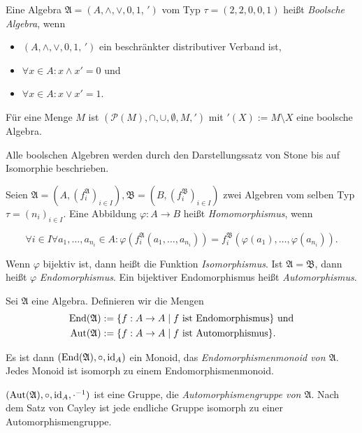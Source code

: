 \begin{definition}
    Eine Algebra $\mathfrak{A} = (A, \wedge, \vee, 0, 1, \,')$ vom Typ $\tau = (2,2,0,0,1)$ heißt \emph{Boolsche Algebra}, wenn
    \begin{itemize}[topsep=0pt, label={--}]
        \item $(A, \wedge, \vee, 0, 1, \,')$ ein beschränkter distributiver Verband ist,
        \item $\forall x \in A: x \wedge x' = 0$ und
        \item $\forall x \in A: x \vee x' = 1$.
    \end{itemize}
\end{definition}

\begin{example}
    Für eine Menge $M$ ist $(\mathcal{P}(M), \cap, \cup, \emptyset, M, ')$ mit $'(X) := M \setminus X$ eine boolsche Algebra.
\end{example}

\begin{remark}
    Alle boolschen Algebren werden durch den Darstellungssatz von Stone bis auf Isomorphie beschrieben.
\end{remark}

\begin{definition}
    Seien $\mathfrak{A} = (A, (f_i^\mathfrak{A})_{i \in I}), \mathfrak{B} = (B, (f_i^\mathfrak{B})_{i \in I})$ zwei Algebren vom selben Typ $\tau = (n_i)_{i \in I}$. Eine Abbildung $\varphi: A \to B$ heißt \emph{Homomorphismus}, wenn

    $$\forall i \in I \forall a_1, \ldots, a_{n_i} \in A: \varphi(f_i^\mathfrak{A}(a_1, \ldots, a_{n_i})) = f_i^\mathfrak{B}(\varphi(a_1), \ldots, \varphi(a_{n_i})). $$

    Wenn $\varphi$ bijektiv ist, dann heißt die Funktion \emph{Isomorphismus}.
    Ist $\mathfrak{A} = \mathfrak{B}$, dann heißt $\varphi$ \emph{Endomorphismus}. Ein bijektiver Endomorphismus heißt \emph{Automorphismus}.
\end{definition}

\begin{example}
    Sei $\mathfrak{A}$ eine Algebra. Definieren wir die Mengen \begin{align*}
        \operatorname{End}(\mathfrak{A}) &:= \{f: A \to A \;\vert\; f\text{ ist Endomorphismus}\} \text{ und} \\ \operatorname{Aut}(\mathfrak{A}) &:= \{f: A \to A \;\vert\; f\text{ ist Automorphismus}\}.
    \end{align*}

    Es ist dann $(\operatorname{End}(\mathfrak{A}), \circ, \operatorname{id}_A)$ ein Monoid, das \emph{Endomorphismenmonoid von $\mathfrak{A}$}. Jedes Monoid ist isomorph zu einem Endomorphismenmonoid.
    
    $(\operatorname{Aut}(\mathfrak{A}), \circ, \operatorname{id}_A, \cdot^{-1})$ ist eine Gruppe, die \emph{Automorphismengruppe von $\mathfrak{A}$}. Nach dem Satz von Cayley ist jede endliche Gruppe isomorph zu einer Automorphismengruppe.
\end{example}